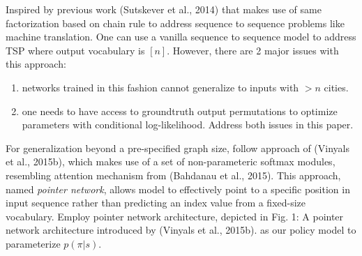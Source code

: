 \documentclass{article}
\begin{document}
\begin{itemize}
    Inspired by previous work (Sutskever et al., 2014) that makes use of same factorization based on chain rule to address sequence to sequence problems like machine translation. One can use a vanilla sequence to sequence model to address TSP where output vocabulary is $[n]$. However, there are 2 major issues with this approach:
    \begin{enumerate}
        \item networks trained in this fashion cannot generalize to inputs with $> n$ cities.
        \item one needs to have access to groundtruth output permutations to optimize parameters with conditional log-likelihood. Address both issues in this paper.
    \end{enumerate}
    For generalization beyond a pre-specified graph size, follow approach of (Vinyals et al., 2015b), which makes use of a set of non-parameteric softmax modules, resembling attention mechanism from (Bahdanau et al., 2015). This approach, named {\it pointer network}, allows model to effectively point to a specific position in input sequence rather than predicting an index value from a fixed-size vocabulary. Employ pointer network architecture, depicted in {\sf Fig. 1: A pointer network architecture introduced by (Vinyals et al., 2015b).} as our policy model to parameterize $p(\pi|s)$.
    

\end{itemize}
\end{document}
